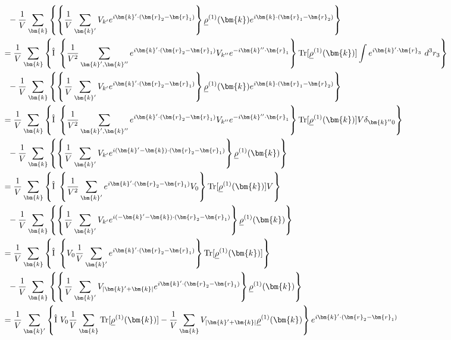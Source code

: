 \documentclass[dvipdfmx, 11pt, a4paper]{jsarticle}
\numberwithin{equation}{section}
\theoremstyle{definition}
\begin{document}
\begin{derivationBox}
\begin{align}
            &\ \ -\frac{1}{V}\sum_{\bm{k}}\left\{  \left\{ \frac{1}{V} \sum_{\bm{k}'} V_{k'}  e^{i\bm{k}'\cdot (\bm{r}_2 - \bm{r}_1)} \right\}  \underline{\rho}^{(1)}(\bm{k}) e^{i\bm{k}\cdot(\bm{r}_1 - \bm{r}_2)} \right\} \notag \\
            &= \frac{1}{V}\sum_{\bm{k}}\left\{ \hat{\mathrm{I}}\ \left\{ \frac{1}{V^2} \sum_{\bm{k}',\bm{k}''} e^{i\bm{k}'\cdot (\bm{r}_2 - \bm{r}_1)} V_{k''}  e^{-i\bm{k}''\cdot   \bm{r}_1} \right\}  \mathrm{Tr}[ \underline{\rho}^{(1)}(\bm{k}) ]\int e^{i\bm{k}'\cdot \bm{r}_3} \ d^3r_3 \right\} \notag \\
            &\ \ -\frac{1}{V}\sum_{\bm{k}}\left\{  \left\{ \frac{1}{V} \sum_{\bm{k}'} V_{k'}  e^{i\bm{k}'\cdot (\bm{r}_2 - \bm{r}_1)} \right\}  \underline{\rho}^{(1)}(\bm{k}) e^{i\bm{k}\cdot(\bm{r}_1 - \bm{r}_2)} \right\} \notag \\
            &= \frac{1}{V}\sum_{\bm{k}}\left\{ \hat{\mathrm{I}}\ \left\{ \frac{1}{V^2} \sum_{\bm{k}',\bm{k}''} e^{i\bm{k}'\cdot (\bm{r}_2 - \bm{r}_1)} V_{k''}  e^{-i\bm{k}''\cdot   \bm{r}_1} \right\}  \mathrm{Tr}[ \underline{\rho}^{(1)}(\bm{k}) ]V \delta_{\bm{k}'' 0} \right\} \notag \\
            &\ \ -\frac{1}{V}\sum_{\bm{k}}\left\{  \left\{ \frac{1}{V} \sum_{\bm{k}'} V_{k'}  e^{i(\bm{k}'-\bm{k})\cdot (\bm{r}_2 - \bm{r}_1)} \right\}  \underline{\rho}^{(1)}(\bm{k})  \right\} \notag \\
            &= \frac{1}{V}\sum_{\bm{k}}\left\{ \hat{\mathrm{I}}\ \left\{ \frac{1}{V^2} \sum_{\bm{k}'} e^{i\bm{k}'\cdot (\bm{r}_2 - \bm{r}_1)} V_{0}  \right\}  \mathrm{Tr}[ \underline{\rho}^{(1)}(\bm{k}) ]V \right\} \notag \\
            &\ \ -\frac{1}{V}\sum_{\bm{k}}\left\{  \left\{ \frac{1}{V} \sum_{\bm{k}'} V_{k'}  e^{i(-\bm{k}'-\bm{k})\cdot (\bm{r}_2 - \bm{r}_1)} \right\}  \underline{\rho}^{(1)}(\bm{k})  \right\} \notag \\
            &= \frac{1}{V}\sum_{\bm{k}}\left\{ \hat{\mathrm{I}}\ \left\{ V_{0}\frac{1}{V} \sum_{\bm{k}'} e^{i\bm{k}'\cdot (\bm{r}_2 - \bm{r}_1)}   \right\}  \mathrm{Tr}[ \underline{\rho}^{(1)}(\bm{k}) ] \right\} \notag \\
            &\ \ -\frac{1}{V}\sum_{\bm{k}}\left\{  \left\{ \frac{1}{V} \sum_{\bm{k}'} V_{|\bm{k}'+\bm{k}|}  e^{i\bm{k}'\cdot (\bm{r}_2 - \bm{r}_1)} \right\}  \underline{\rho}^{(1)}(\bm{k})  \right\} \notag \\
            &= \frac{1}{V}\sum_{\bm{k}'} \left\{ \hat{\mathrm{I}}\ V_{0}\frac{1}{V} \sum_{\bm{k}}     \mathrm{Tr}[ \underline{\rho}^{(1)}(\bm{k}) ]   -  \frac{1}{V} \sum_{\bm{k}} V_{|\bm{k}'+\bm{k}|}     \underline{\rho}^{(1)}(\bm{k})\right\} e^{i\bm{k}'\cdot (\bm{r}_2 - \bm{r}_1)} \notag \\

\end{align}
\end{derivationBox}
\end{document}
